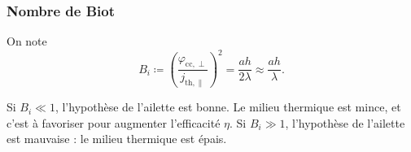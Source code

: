         \subsubsection{Nombre de Biot}

            On note
            \begin{equation}
                \boxed{
                    B_i\coloneqq\left(\frac{\varphi_{\text{cc},\perp}}{j_{\text{th},\parallel}}\right)^{2}=\frac{ah}{2\lambda}\approx\frac{ah}{\lambda}.
                }
            \end{equation}

            Si $B_i\ll1$, l'hypothèse de l'ailette est bonne. Le milieu thermique est mince, et c'est à favoriser pour augmenter l'efficacité $\eta$.
            Si $B_i\gg1$, l'hypothèse de l'ailette est mauvaise : le milieu thermique est épais.